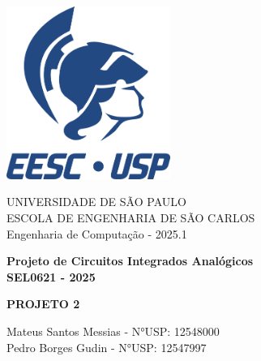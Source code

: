 ﻿\documentclass[12pt,a4paper]{article}
\newcommand{\imprimirMateria}{Projeto de Circuitos Integrados Analógicos}
\newcommand{\imprimirCodMateria}{SEL0621}
\newcommand{\imprimirTitulo}{Projeto 2}
\newcommand{\imprimirSubtitulo}{Engenharia de Computação}
\newcommand{\imprimirAutores}{Mateus Santos Messias - N°USP: 12548000 \\ Pedro Borges Gudin - N°USP: 12547997}
\newcommand{\imprimirAno}{2025}
\begin{document}
\begin{titlepage}
    \begin{center}
        \vspace*{0.5cm}
        \includegraphics[width=0.4\textwidth]{images/Logo EESC-USP - Vertical Monocromatico Azul (ECM).png}
            
        \Large
        \vspace{1cm}
        UNIVERSIDADE DE SÃO PAULO\\
        ESCOLA DE ENGENHARIA DE SÃO CARLOS\\
        \imprimirSubtitulo{} - \imprimirAno.1
        

        \vspace{2cm}
        \LARGE
        \textbf{
            \imprimirMateria{}\\
            \imprimirCodMateria{} - \imprimirAno
        }
        
        \vspace{3.5cm}
        \Huge
        \uppercase{\textbf{\imprimirTitulo}}
        
        \vfill
        
        \large
        \imprimirAutores
        
        \vspace{2cm}
        
    \end{center}
\end{titlepage}

\newpage

\begin{abstract}
Este trabalho apresenta o projeto e desenvolvimento de fontes de referência de corrente e tensão tipo bandgap utilizando tecnologia CMOS 0,35µm da AMS. O projeto aborda o estudo de transistores MOS operando em fraca inversão, técnicas de casamento de componentes e a implementação de circuitos de referência estáveis com a temperatura. Foi desenvolvida uma fonte de corrente de referência baseada em transistores em fraca inversão e espelhos de corrente, seguida pela implementação de uma fonte de tensão bandgap que combina grandezas PTAT (Proportional To Absolute Temperature) e CTAT (Complementary To Absolute Temperature) para obter coeficiente de temperatura inferior a 50 ppm/°C.
\end{abstract}
\end{document}

